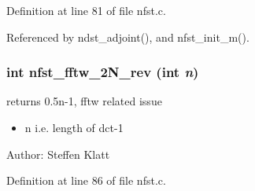 Definition at line 81 of file nfst.c.

Referenced by ndst\_\-adjoint(), and nfst\_\-init\_\-m().\hypertarget{group__nfsct_ga31}{
\subsubsection[nfst\_\-fftw\_\-2N\_\-rev]{\setlength{\rightskip}{0pt plus 5cm}int nfst\_\-fftw\_\-2N\_\-rev (int {\em n})}}
\label{group__nfsct_ga31}


returns 0.5n-1, fftw related issue 

\begin{itemize}
\item n i.e. length of dct-1\end{itemize}
\begin{Desc}
\item[Author:]Steffen Klatt \end{Desc}


Definition at line 86 of file nfst.c.